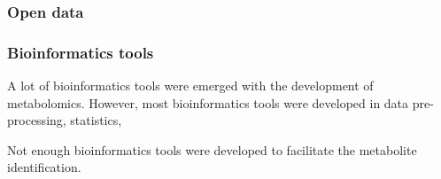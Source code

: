\subsubsection{Open data}

\subsubsection{Bioinformatics tools}
A lot of bioinformatics tools were emerged with the development of metabolomics. However, most bioinformatics tools were developed in data pre-processing, statistics, 

Not enough bioinformatics tools were developed to facilitate the metabolite identification.